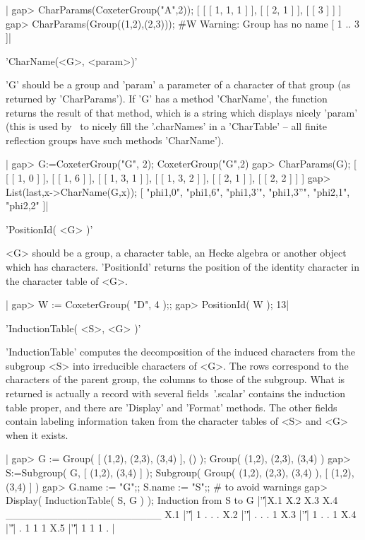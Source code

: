 |    gap> CharParams(CoxeterGroup("A",2));
    [ [ [ 1, 1, 1 ] ], [ [ 2, 1 ] ], [ [ 3 ] ] ]
    gap> CharParams(Group((1,2),(2,3)));
    #W  Warning: Group has no name
    [ 1 .. 3 ]|

%
%

'CharName(<G>, <param>)'

'G' should  be a group  and 'param' a parameter  of a character  of that
group (as returned by 'CharParams'). If 'G' has a method 'CharName', the
function returns  the result  of that  method, which  is a  string which
displays nicely  'param' (this is  used by  \CHEVIE\ to nicely  fill the
'.charNames' in a 'CharTable' --  all finite reflection groups have such
methods 'CharName').

|    gap> G:=CoxeterGroup("G", 2);
    CoxeterGroup("G",2)
    gap> CharParams(G);
    [ [ [ 1, 0 ] ], [ [ 1, 6 ] ], [ [ 1, 3, 1 ] ], [ [ 1, 3, 2 ] ],
      [ [ 2, 1 ] ], [ [ 2, 2 ] ] ]
    gap>  List(last,x->CharName(G,x));
    [ "phi{1,0}", "phi{1,6}", "phi{1,3}'", "phi{1,3}''", "phi{2,1}",
      "phi{2,2}" ]|


'PositionId( <G> )'

<G>  should be  a group,  a character  table, an  Hecke algebra  or another
object  which  has  characters.  'PositionId'  returns  the position of the
identity character in the character table of <G>.

|    gap> W := CoxeterGroup( "D", 4 );;
    gap> PositionId( W );
    13|

%

'InductionTable( <S>, <G> )'

'InductionTable'  computes the decomposition of the induced characters from
the subgroup <S> into irreducible characters of <G>. The rows correspond to
the  characters of the parent group, the  columns to those of the subgroup.
What  is returned  is actually  a record  with several  fields\:\ '.scalar'
contains  the induction table proper, and  there are 'Display' and 'Format'
methods.  The  other  fields  contain  labeling  information taken from the
character tables of <S> and <G> when it exists.

|    gap> G := Group( [ (1,2), (2,3), (3,4) ], () );
    Group( (1,2), (2,3), (3,4) )
    gap> S:=Subgroup( G, [ (1,2), (3,4) ] );
    Subgroup( Group( (1,2), (2,3), (3,4) ), [ (1,2), (3,4) ] )
    gap> G.name := "G";; S.name := "S";; # to avoid warnings
    gap> Display( InductionTable( S, G ) );
    Induction from S to G
        |'\|'|X.1 X.2 X.3 X.4
    _____________________
    X.1 |'\|'|  1   .   .   .
    X.2 |'\|'|  .   .   .   1
    X.3 |'\|'|  1   .   .   1
    X.4 |'\|'|  .   1   1   1
    X.5 |'\|'|  1   1   1   . |

